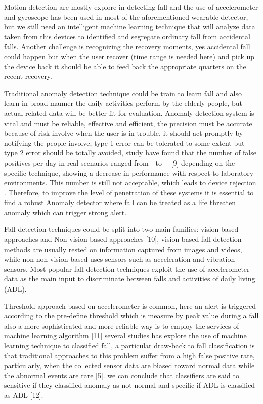 \documentclass[a4paper, parskip=full]{scrartcl}
\begin{document}
Motion detection are mostly explore in detecting fall and the use of accelerometer and gyroscope has been used in most of the aforementioned wearable detector, but we still need an intelligent machine learning technique that will analyze data taken from  this devices to identified and segregate ordinary fall from accidental falls. Another challenge is recognizing the recovery moments, yes accidental fall could happen but when the user recover (time range is needed here) and pick up the device back it should be able to feed back the appropriate quarters on the recent recovery. 

Traditional anomaly detection technique could be train to learn fall and also learn  in broad manner the daily activities perform by the elderly people, but actual related data will be better fit for evaluation. Anomaly detection system is vital and must be reliable, effective and efficient, the precision must be accurate because of risk involve when the user is in trouble, it should act promptly by notifying the people involve, type 1 error can be tolerated to some extent but type 2 error should be totally avoided, study have found that the number of false positives per day in real scenarios ranged from  to   [9] depending on the specific technique, showing a decrease in performance with respect to laboratory environments. This number is still not acceptable, which leads to device rejection . Therefore, to improve the level of penetration of these systems it is essential to find a robust Anomaly detector where fall can be treated as a life threaten anomaly which can trigger strong alert.

Fall detection techniques could be split into two main families:  vision based approaches and Non-vision based approaches [10], vision-based fall detection methods are usually rested on information captured from images and videos, while non non-vision based uses sensors such as acceleration and vibration sensors. Most popular fall detection techniques exploit the use of accelerometer data as the main input to discriminate between falls and activities of daily living (ADL). 

Threshold approach based on accelerometer is common, here an alert is triggered according to the pre-define threshold which is measure by peak value during a fall also a more sophisticated and more reliable way is to employ the services of machine learning algorithm [11]  several studies has explore the use of machine learning technique to classified fall,  a particular draw-back to fall classification is that traditional approaches to this problem suffer from a high false positive rate, particularly, when the collected sensor data are biased toward normal data while the abnormal events are rare [5]. we can conclude that classifiers are said to sensitive if they classified anomaly as not normal and specific if ADL is classified as ADL [12].
\end{document}
